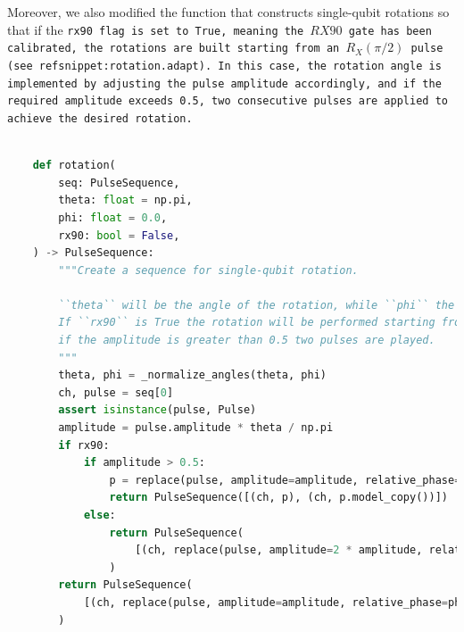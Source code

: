 Moreover, we also modified the function that constructs single-qubit rotations so that if the \tt{rx90} flag is set to \tt{True}, meaning the $RX90$ gate has been calibrated, the rotations are built starting from an $R_X(\pi/2)$ pulse (see ref{snippet:rotation.adapt}). 
In this case, the rotation angle is implemented by adjusting the pulse amplitude accordingly, and if the required amplitude exceeds 0.5, two consecutive pulses are applied to achieve the desired rotation.

\begin{lstlisting}[language=Python, caption={Arbitrary qubit rotation implementation in \Qibolab.}, label={snippet:rotation.adapt}]
    
    def rotation(
        seq: PulseSequence,
        theta: float = np.pi,
        phi: float = 0.0,
        rx90: bool = False,
    ) -> PulseSequence:
        """Create a sequence for single-qubit rotation.
    
        ``theta`` will be the angle of the rotation, while ``phi`` the angle that the rotation axis forms with x axis.
        If ``rx90`` is True the rotation will be performed starting from an RX90 pulse doubling its amplitude,
        if the amplitude is greater than 0.5 two pulses are played.
        """
        theta, phi = _normalize_angles(theta, phi)
        ch, pulse = seq[0]
        assert isinstance(pulse, Pulse)
        amplitude = pulse.amplitude * theta / np.pi
        if rx90:
            if amplitude > 0.5:
                p = replace(pulse, amplitude=amplitude, relative_phase=phi)
                return PulseSequence([(ch, p), (ch, p.model_copy())])
            else:
                return PulseSequence(
                    [(ch, replace(pulse, amplitude=2 * amplitude, relative_phase=phi))]
                )
        return PulseSequence(
            [(ch, replace(pulse, amplitude=amplitude, relative_phase=phi))]
        )

\end{lstlisting}


